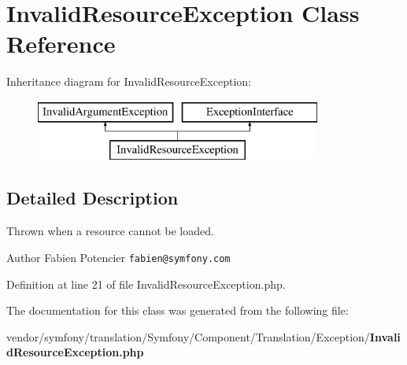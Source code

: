 \section{Invalid\+Resource\+Exception Class Reference}
\label{class_symfony_1_1_component_1_1_translation_1_1_exception_1_1_invalid_resource_exception}
Inheritance diagram for Invalid\+Resource\+Exception\+:\begin{figure}[H]
\begin{center}
\leavevmode
\includegraphics[height=2.000000cm]{class_symfony_1_1_component_1_1_translation_1_1_exception_1_1_invalid_resource_exception}
\end{center}
\end{figure}


\subsection{Detailed Description}
Thrown when a resource cannot be loaded.

\begin{DoxyAuthor}{Author}
Fabien Potencier {\tt fabien@symfony.\+com}
\end{DoxyAuthor}


Definition at line 21 of file Invalid\+Resource\+Exception.\+php.



The documentation for this class was generated from the following file\+:\begin{DoxyCompactItemize}
\item 
vendor/symfony/translation/\+Symfony/\+Component/\+Translation/\+Exception/{\bf Invalid\+Resource\+Exception.\+php}\end{DoxyCompactItemize}
